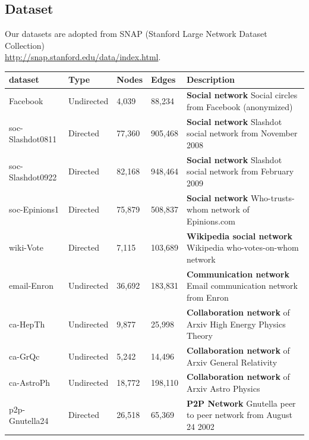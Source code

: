 \subsection{Dataset}

Our datasets are adopted from SNAP (Stanford Large Network Dataset Collection) \\
\url{http://snap.stanford.edu/data/index.html}.

\begin{table}[H]
	\begin{tabular}{| l | l | l | l | p{8cm} |}
	  \hline			
	  dataset & Type & Nodes & Edges & Description \\ \hline

	  Facebook & Undirected & 4,039 & 88,234 & \textbf{Social network} Social circles from Facebook (anonymized) \\ \hline

	  soc-Slashdot0811 & Directed & 77,360 & 905,468 & \textbf{Social network} Slashdot social network from November 2008 \\ \hline

	  soc-Slashdot0922 & Directed & 82,168 & 948,464 & \textbf{Social network} Slashdot social network from February 2009 \\ \hline

	  soc-Epinions1 & Directed & 75,879	& 508,837 & \textbf{Social network} Who-trusts-whom network of Epinions.com \\ \hline

	  wiki-Vote	& Directed & 7,115 & 103,689 & \textbf{Wikipedia social network} Wikipedia who-votes-on-whom network \\ \hline

	  email-Enron & Undirected & 36,692 & 183,831 & \textbf{Communication network} Email communication network from Enron \\ \hline
	  
	  ca-HepTh & Undirected & 9,877	& 25,998 & \textbf{Collaboration network} of Arxiv High Energy Physics Theory \\ \hline

	  ca-GrQc & Undirected & 5,242 & 14,496 & \textbf{Collaboration network} of Arxiv General Relativity \\ \hline

	  ca-AstroPh & Undirected & 18,772 & 198,110 & \textbf{Collaboration network} of Arxiv Astro Physics \\ \hline

	  p2p-Gnutella24 & Directed & 26,518 & 65,369 & \textbf{P2P Network} Gnutella peer to peer network from August 24 2002 \\ \hline


\end{tabular}
\end{table}
